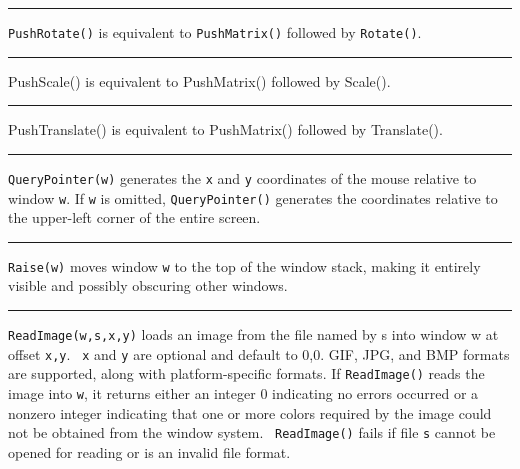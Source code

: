 \bigskip\hrule\vspace{0.1cm}

\noindent
\texttt{PushRotate()} is equivalent to \texttt{PushMatrix()} followed by
\texttt{Rotate()}.

\bigskip\hrule\vspace{0.1cm}

\noindent
{\sffamily
PushScale()\textrm{ is equivalent to }PushMatrix()\textrm{ followed by
}Scale()\textrm{.}}

\bigskip\hrule\vspace{0.1cm}

\noindent
{\sffamily
PushTranslate()\textrm{ is equivalent to }PushMatrix()\textrm{ followed
by }Translate()\textrm{.}}

\bigskip\hrule\vspace{0.1cm}

\noindent
\texttt{QueryPointer(w)} generates the \texttt{x} and \texttt{y}
coordinates of the mouse relative to window \texttt{w}. If \texttt{w}
is omitted, \texttt{QueryPointer()} generates the coordinates relative
to the upper-left corner of the entire screen.

\bigskip\hrule\vspace{0.1cm}

\noindent
\texttt{Raise(w)} moves window \texttt{w} to the top of the window
stack, making it entirely visible and possibly obscuring other windows.

\bigskip\hrule\vspace{0.1cm}

\noindent
\texttt{ReadImage(w,s,x,y)} loads an image from the file named by s into
window w at offset \texttt{x,y}. \texttt{\ x} and \texttt{y} are
optional and default to 0,0. GIF, JPG, and BMP formats are supported,
along with platform-specific formats. If \texttt{ReadImage()} reads the
image into \texttt{w}, it returns either an integer 0 indicating no
errors occurred or a nonzero integer indicating that one or more colors
required by the image could not be obtained from the window system.
\ \texttt{ReadImage()} fails if file \texttt{s} cannot be opened for
reading or is an invalid file format.

